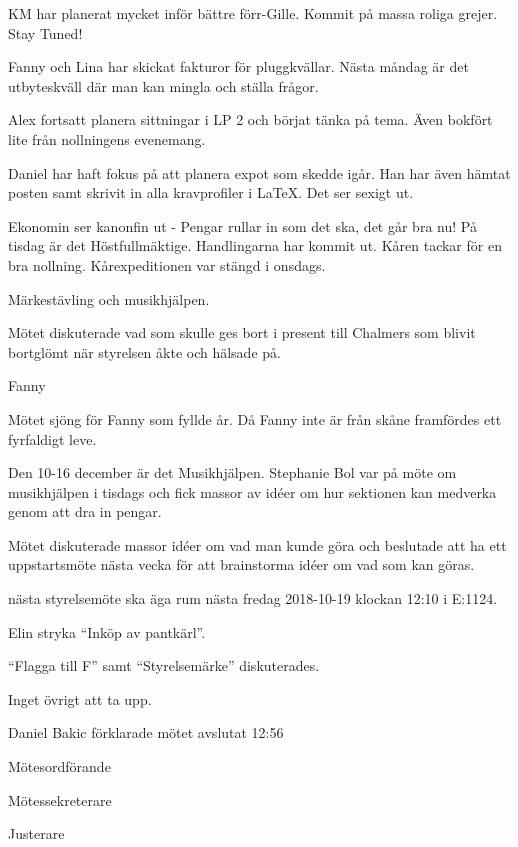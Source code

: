 \documentclass[10pt]{article}
\def\mo{Daniel Bakic}
\def\ms{Magnus Lundh}
\def\ji{Adam Belfrage}
\begin{document}
\begin{paragrafer}
\begin{paragrafer}
		KM har planerat mycket inför bättre förr-Gille. Kommit på massa roliga grejer. Stay Tuned!
		
		Fanny och Lina har skickat fakturor för pluggkvällar. Nästa måndag är det utbyteskväll där man kan mingla och ställa frågor.
		
		Alex fortsatt planera sittningar i LP 2 och börjat tänka på tema. Även bokfört lite från nollningens evenemang.
		
		Daniel har haft fokus på att planera expot som skedde igår. Han har även hämtat posten samt skrivit in
		alla kravprofiler i \LaTeX. Det ser sexigt ut.

		Ekonomin ser kanonfin ut - Pengar rullar in som det ska, det går bra nu!
		På tisdag är det Höstfullmäktige. Handlingarna har kommit ut. Kåren tackar för en bra nollning. Kårexpeditionen var stängd i onsdags.



		Märkestävling och musikhjälpen.

	\end{paragrafer}

	Mötet diskuterade vad som skulle ges bort i present till Chalmers som blivit bortglömt när styrelsen åkte och hälsade på.
	
	Fanny 

	\Mbaby

	Mötet sjöng för Fanny som fyllde år. Då Fanny inte är från skåne framfördes ett fyrfaldigt leve.

	Den 10-16 december är det Musikhjälpen.
	Stephanie Bol var på möte om musikhjälpen i tisdags och fick massor av idéer om hur sektionen kan medverka genom att dra in pengar.

	Mötet diskuterade massor idéer om vad man kunde göra och beslutade att ha ett uppstartsmöte nästa vecka för att brainstorma idéer om vad som kan göras.


	\Mba nästa styrelsemöte ska äga rum nästa fredag 2018-10-19 klockan 12:10 i E:1124.


	Elin \ypa stryka ``Inköp av pantkärl''.

	\Mbaby

	``Flagga till F'' samt ``Styrelsemärke'' diskuterades.



	Inget övrigt att ta upp.

	{\mo} förklarade mötet avslutat 12:56
\end{paragrafer}

\hidesignfoot
\begin{signatures}{3}
	\signature{\mo}{Mötesordförande}
	\signature{\ms}{Mötessekreterare}
	\signature{\ji}{Justerare}
\end{signatures}
\end{document}
